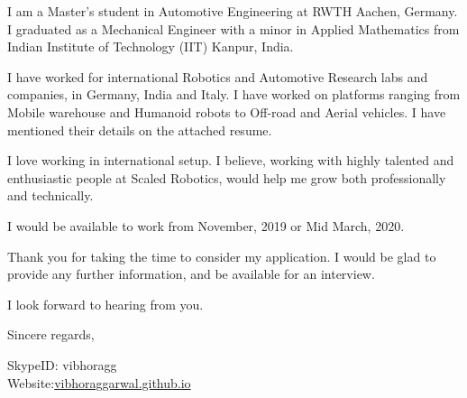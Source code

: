 \documentclass{letter} %
\begin{document}
\begin{letter}
I am a Master's student in Automotive Engineering at RWTH Aachen, Germany. I graduated as a Mechanical Engineer with a minor in Applied Mathematics from Indian Institute of Technology (IIT) Kanpur, India.

I have worked for international Robotics and Automotive Research labs and companies, in Germany, India and Italy. I have worked on platforms ranging from Mobile warehouse and Humanoid robots to Off-road and Aerial vehicles. I have mentioned their details on the attached resume. 

 I love working in international setup. I believe, working with highly talented and enthusiastic people at Scaled Robotics, would help me grow both professionally and technically. 
 
I would be available to work from November, 2019 or Mid March, 2020.

Thank you for taking the time to consider my application. I would be glad to provide any further information, and be available for an interview.

I look forward to hearing from you.

\closing{Sincere regards,} 
SkypeID: vibhoragg\\
Website:\href{https://vibhoraggarwal.github.io/}{vibhoraggarwal.github.io}

\end{letter}
 
\end{document}
